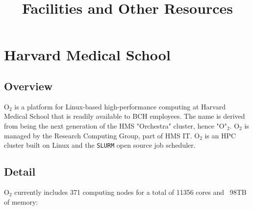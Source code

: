 \documentclass[11pt]{amsart}
\title{Facilities and Other Resources}
\author{}
\date{}
\begin{document}
\maketitle
\hypertarget{x-harvard-medical-school}{\section*{Harvard Medical School}}
\hypertarget{x-overview}{\subsection*{Overview}}
O${}_{2}$ is a platform for Linux-based high-performance computing at Harvard Medical School that is readily available to BCH employees. The name is derived from being the next generation of the HMS "Orchestra" cluster, hence "O"${}_{2}$. O${}_{2}$ is managed by the Research Computing Group, part of HMS IT. O${}_{2}$ is an HPC cluster built on Linux and the \texttt{SLURM} open source job scheduler.


\hypertarget{x-detail}{\subsection*{Detail}}
O${}_{2}$ currently includes 371 computing nodes for a total of 11356 cores and ~98TB of memory:
\end{document}
